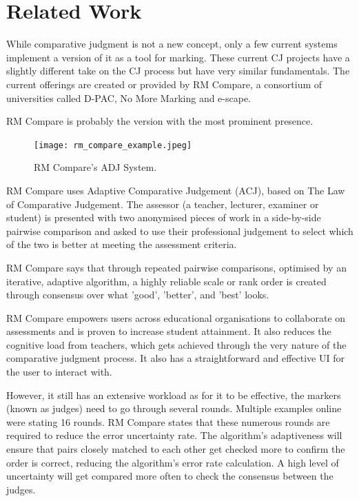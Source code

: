 	
	
	\section{Related Work}
		\label{sec:google_fu}
		
		While comparative judgment is not a new concept, only a few current systems implement a version of it as a tool for marking. These current CJ projects have a slightly different take on the CJ process but have very similar fundamentals. The current offerings are created or provided by RM Compare, a consortium of universities called D-PAC, No More Marking and e-scape.
		
		RM Compare is probably the version with the most prominent presence. 
		
		\begin{figure}[t]
			\centering
			\texttt{[image: rm\_compare\_example.jpeg]}
			\caption{RM Compare's ADJ System.}
			\label{fig:rm_compare_ex}
			
		\end{figure}
		
		RM Compare uses Adaptive Comparative Judgement (ACJ), based on The Law of Comparative Judgement. The assessor (a teacher, lecturer, examiner or student) is presented with two anonymised pieces of work in a side-by-side pairwise comparison and asked to use their professional judgement to select which of the two is better at meeting the assessment criteria.
		
		RM Compare says that through repeated pairwise comparisons, optimised by an iterative, adaptive algorithm, a highly reliable scale or rank order is created through consensus over what 'good', 'better', and 'best' looks.
		
		RM Compare empowers users across educational organisations to collaborate on assessments and is proven to increase student attainment. It also reduces the cognitive load from teachers, which gets achieved through the very nature of the comparative judgment process. It also has a straightforward and effective UI for the user to interact with.
	
		However, it still has an extensive workload as for it to be effective, the markers (known as judges) need to go through several rounds. Multiple examples online were stating 16 rounds. RM Compare states that these numerous rounds are required to reduce the error uncertainty rate.  The algorithm's adaptiveness will ensure that pairs closely matched to each other get checked more to confirm the order is correct, reducing the algorithm's error rate calculation. A high level of uncertainty will get compared more often to check the consensus between the judges. 
	
